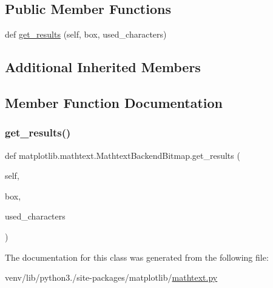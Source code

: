 \subsection*{Public Member Functions}
\begin{DoxyCompactItemize}
\item 
def \hyperlink{classmatplotlib_1_1mathtext_1_1MathtextBackendBitmap_ae8d69969c7f5fdfb7ea90b7622ccc293}{get\+\_\+results} (self, box, used\+\_\+characters)
\end{DoxyCompactItemize}
\subsection*{Additional Inherited Members}


\subsection{Member Function Documentation}
\mbox{\label{classmatplotlib_1_1mathtext_1_1MathtextBackendBitmap_ae8d69969c7f5fdfb7ea90b7622ccc293}} 
\subsubsection{\texorpdfstring{get\+\_\+results()}{get\_results()}}
{\footnotesize\ttfamily def matplotlib.\+mathtext.\+Mathtext\+Backend\+Bitmap.\+get\+\_\+results (\begin{DoxyParamCaption}\item[{}]{self,  }\item[{}]{box,  }\item[{}]{used\+\_\+characters }\end{DoxyParamCaption})}



The documentation for this class was generated from the following file\+:\begin{DoxyCompactItemize}
\item 
venv/lib/python3./site-\/packages/matplotlib/\hyperlink{mathtext_8py}{mathtext.\+py}\end{DoxyCompactItemize}

